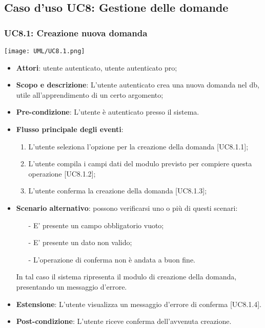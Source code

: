 \subsection{Caso d'uso UC8: Gestione delle domande}
	
\subsubsection{UC8.1: Creazione nuova domanda}
	\begin{center}
		\texttt{[image: UML/UC8.1.png]}
	\end{center}
	\begin{itemize}
		\item
			\textbf{Attori}: utente autenticato, utente autenticato pro;
		\item		
			\textbf{Scopo e descrizione}: L'utente autenticato crea una nuova domanda nel db, utile all'apprendimento di un certo argomento;
		\item
			\textbf{Pre-condizione}: L'utente è autenticato presso il sistema. 
		\item
			\textbf{Flusso principale degli eventi}:
	       		\begin{enumerate}
					\item 	
					L'utente seleziona l'opzione per la creazione della domanda [UC8.1.1];
					\item
					L'utente compila i campi dati del modulo previsto per compiere questa operazione [UC8.1.2];
					\item
					L'utente conferma la creazione della domanda [UC8.1.3];
	 			\end{enumerate}
	 	\item
	 		\textbf{Scenario alternativo}: possono verificarsi uno o più di questi scenari:
				\begin{itemize}
					\item[-] 	
						E' presente un campo obbligatorio vuoto;
					\item[-] 
    						E' presente  un dato non valido;
					\item[-] 
						L'operazione di conferma non è andata a buon fine.
				\end{itemize}
			In tal caso il sistema ripresenta il modulo di creazione della domanda, presentando un messaggio d'errore.
		\item
			\textbf{Estensione}: L'utente visualizza un messaggio d'errore di conferma [UC8.1.4].
		\item
			\textbf{	Post-condizione}: L'utente riceve conferma dell'avvenuta creazione.
	\end{itemize}
